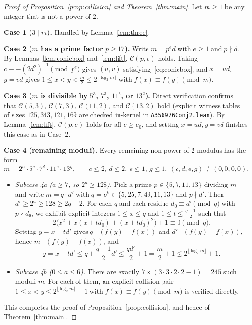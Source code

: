 \documentclass[11pt,reqno]{amsart}
\theoremstyle{remark}
\begin{document}
\begin{proof}[Proof of Proposition~\ref{prop:collision} and Theorem~\ref{thm:main}]
Let $m \ge 1$ be any integer that is not a power of $2$.

\textbf{Case 1 ($3 \mid m$).} Handled by Lemma~\ref{lem:three}.

\textbf{Case 2 ($m$ has a prime factor $p \ge 17$).} Write $m = p^e d$ with $e \ge 1$ and $p \nmid d$. By Lemmas~\ref{lem:conicbox} and~\ref{lem:lift}, $\mathcal{C}(p, e)$ holds. Taking $c \equiv -(2d^2)^{-1} \pmod{p^e}$ gives $(u, v)$ satisfying~\eqref{eq:conicbox}, and $x = ud$, $y = vd$ gives $1 \le x < y < \frac{m}{2} \le 2^{\lfloor \log_2 m \rfloor}$ with $f(x) \equiv f(y) \pmod m$.

\textbf{Case 3 ($m$ is divisible by $5^3$, $7^3$, $11^2$, or $13^2$).} Direct verification confirms that $\mathcal{C}(5, 3)$, $\mathcal{C}(7, 3)$, $\mathcal{C}(11, 2)$, and $\mathcal{C}(13, 2)$ hold (explicit witness tables of sizes $125, 343, 121, 169$ are checked in-kernel in \texttt{A356976Conj2.lean}). By Lemma~\ref{lem:lift}, $\mathcal{C}(p, e)$ holds for all $e \ge e_0$, and setting $x = ud, y = vd$ finishes this case as in Case~2.

\textbf{Case 4 (remaining moduli).} Every remaining non-power-of-$2$ modulus has the form
\[
m = 2^a \cdot 5^c \cdot 7^d \cdot 11^e \cdot 13^g,
\qquad c \le 2,\ d \le 2,\ e \le 1,\ g \le 1,\ (c,d,e,g) \neq (0,0,0,0).
\]
\begin{itemize}
\item \emph{Subcase 4a ($a \ge 7$, so $2^a \ge 128$).} Pick a prime $p \in \{5, 7, 11, 13\}$ dividing $m$ and write $m = q \cdot d'$ with $q = p^k \in \{5, 25, 7, 49, 11, 13\}$ and $p \nmid d'$. Then $d' \ge 2^a \ge 128 \ge 2q - 2$. For each $q$ and each residue $d_0 \equiv d' \pmod q$ with $p \nmid d_0$, we exhibit explicit integers $1 \le x \le q$ and $1 \le t \le \frac{q-1}{2}$ such that
\[
2\bigl(x^2 + x(x + td_0) + (x + td_0)^2\bigr) + 1 \equiv 0 \pmod q.
\]
Setting $y = x + t d'$ gives $q \mid (f(y) - f(x))$ and $d' \mid (f(y) - f(x))$, hence $m \mid (f(y) - f(x))$, and
\[
y = x + t d' \le q + \frac{q - 1}{2} d' \le \frac{q d'}{2} + 1 = \frac{m}{2} + 1 \le 2^{\lfloor \log_2 m \rfloor} + 1.
\]
\item \emph{Subcase 4b ($0 \le a \le 6$).} There are exactly $7 \times (3 \cdot 3 \cdot 2 \cdot 2 - 1) = 245$ such moduli $m$. For each of them, an explicit collision pair $1 \le x < y \le 2^{\lfloor \log_2 m \rfloor} + 1$ with $f(x) \equiv f(y) \pmod m$ is verified directly.
\end{itemize}
This completes the proof of Proposition~\ref{prop:collision}, and hence of Theorem~\ref{thm:main}.
\end{proof}
\end{document}
